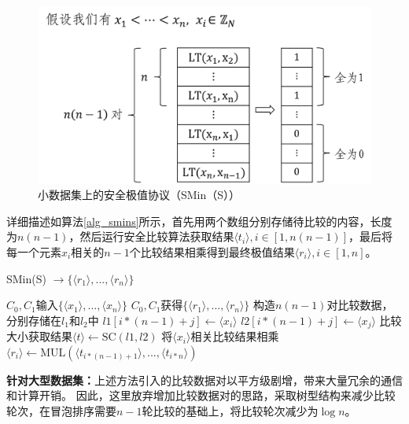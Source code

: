\begin{figure}[htbp]
	\centering
	\includegraphics[scale=0.6]{img/fig4.png}%
	\caption{小数据集上的安全极值协议（SMin（S））}
	\label{smins}
\end{figure}

详细描述如算法\ref{alg_smins}所示，首先用两个数组分别存储待比较的内容，长度为$ n(n-1) $，然后运行安全比较算法获取结果$ \langle t_i \rangle, i \in [1,n(n-1)] $，最后将每一个元素$ x_i $相关的$ n-1 $个比较结果相乘得到最终极值结果$ \langle r_i \rangle, i\in[1,n]$。

\begin{algorithm}[htbp]
	\renewcommand{\algorithmicrequire}{\textbf{输入:}}
	\renewcommand{\algorithmicensure}{\textbf{输出:}}
	\caption{SMin(S) $\rightarrow \{\langle r_1 \rangle,...,\langle r_n\rangle\}$}
	\label{alg_smins}
	\begin{algorithmic}[1]
		\REQUIRE $C_0,C_1$输入$ \{\langle x_1 \rangle,...,\langle x_n\rangle\} $
		\ENSURE $C_0,C_1$获得$\{\langle r_1 \rangle,...,\langle r_n\rangle\}$
		\STATE 构造$ n(n-1) $对比较数据，分别存储在$ l_1 $和$ l_2 $中
		\STATE $ l1[i*(n-1)+j] \leftarrow \langle x_i \rangle $
		\STATE $ l2[i*(n-1)+j] \leftarrow \langle x_j \rangle $
		\ENDFOR
		\ENDFOR
		\STATE 比较大小获取结果$ \langle t \rangle \leftarrow \text{SC}(l1, l2) $
		\STATE 将$ \langle x_i\rangle $相关比较结果相乘$ \langle r_i \rangle \leftarrow \text{MUL}(\langle t_{i*(n-1)+1}\rangle,...,\langle t_{i*n} \rangle)$
		\ENDFOR
	\end{algorithmic}
\end{algorithm}

\textbf{针对大型数据集：}上述方法引入的比较数据对以平方级剧增，带来大量冗余的通信和计算开销。
因此，这里放弃增加比较数据对的思路，采取树型结构来减少比较轮次，在冒泡排序需要$n-1$轮比较的基础上，将比较轮次减少为$\log n$。

